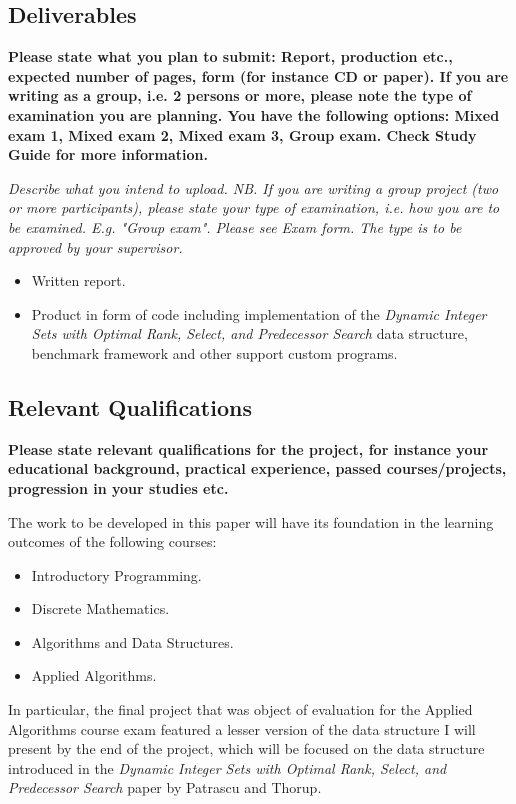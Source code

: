 \subsection*{Deliverables}
\textbf{Please state what you plan to submit: Report, production etc., expected number of pages, form (for instance CD or paper). If you are writing as a group, i.e. 2 persons or more, please note the type of examination you are planning. You have the following options: Mixed exam 1, Mixed exam 2, Mixed exam 3, Group exam. Check Study Guide for more information.}

\textit{Describe what you intend to upload.
NB. If you are writing a group project (two or more participants), please state your type of examination, i.e. how you are to be examined. E.g. "Group exam". Please see Exam form. The type is to be approved by your supervisor.}

\begin{itemize}
    \item Written report.
    \item Product in form of code including implementation of the \textit{Dynamic Integer Sets with Optimal \textit{Rank}, \textit{Select}, and Predecessor Search} data structure, benchmark framework and other support custom programs.
\end{itemize}


\subsection*{Relevant Qualifications}
\textbf{Please state relevant qualifications for the project, for instance your educational background, practical experience, passed courses/projects, progression in your studies etc.}

The work to be developed in this paper will have its foundation in the learning outcomes of the following courses:
\begin{itemize}
    \item Introductory Programming.
    \item Discrete Mathematics.
    \item Algorithms and Data Structures.
    \item Applied Algorithms.
\end{itemize}
In particular, the final project that was object of evaluation for the Applied Algorithms course exam featured a lesser version of the data structure I will present by the end of the project, which will be focused on the data structure introduced in the \textit{Dynamic Integer Sets with Optimal \textit{Rank}, \textit{Select}, and Predecessor Search} paper by Patrascu and Thorup.